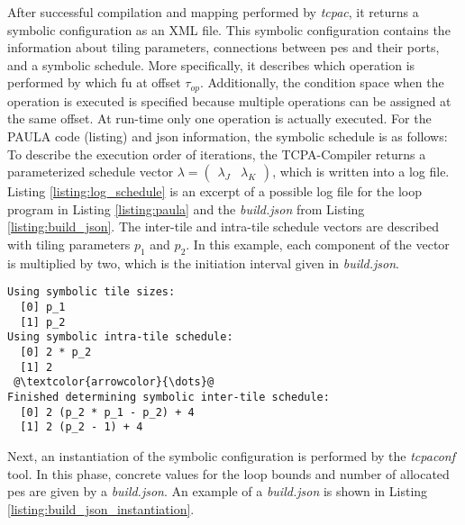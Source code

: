 After successful compilation and mapping performed by \textit{tcpac}, it returns a symbolic configuration as an XML file.
This symbolic configuration contains the information about tiling parameters, connections between \acp{pe} and their ports, and a symbolic schedule.
More specifically, it describes which operation is performed by which \ac{fu} at offset $\tau_{op}$.
Additionally, the condition space when the operation is executed is specified because multiple operations can be assigned at the same offset.
At run-time only one operation is actually executed.
For the PAULA code (listing) and json information, the symbolic schedule is as follows:
To describe the execution order of iterations, the TCPA-Compiler returns a parameterized schedule vector  $\lambda = \begin{pmatrix}\lambda_J & \lambda_K\end{pmatrix}$, 
which is written into a log file.
Listing \ref{listing:log_schedule} is an excerpt of a possible log file for the loop program in Listing \ref{listing:paula} and the \textit{build.json} from Listing \ref{listing:build_json}.
The inter-tile and intra-tile schedule vectors are described with tiling parameters $p_1$ and $p_2$.
In this example, each component of the vector is multiplied by two, which is the initiation interval given in \textit{build.json}.


\begin{lstlisting}[style=log, captionpos=b, escapechar=@,  caption=Excerpt of a log file describing schedule vector $\lambda$ consisting of intra-tile schedule vector $\lambda_J$ and inter-tile schedule vector $\lambda_K$., label=listing:log_schedule ]
Using symbolic tile sizes:
  [0] p_1
  [1] p_2
Using symbolic intra-tile schedule:
  [0] 2 * p_2
  [1] 2
 @\textcolor{arrowcolor}{\dots}@ 
Finished determining symbolic inter-tile schedule:
  [0] 2 (p_2 * p_1 - p_2) + 4
  [1] 2 (p_2 - 1) + 4
\end{lstlisting}


Next, an instantiation of the symbolic configuration is performed by the \textit{tcpaconf} tool.
In this phase, concrete values for the loop bounds and number of allocated \acp{pe} are given by a \textit{build.json}.
An example of a \textit{build.json} is shown in Listing \ref{listing:build_json_instantiation}.

